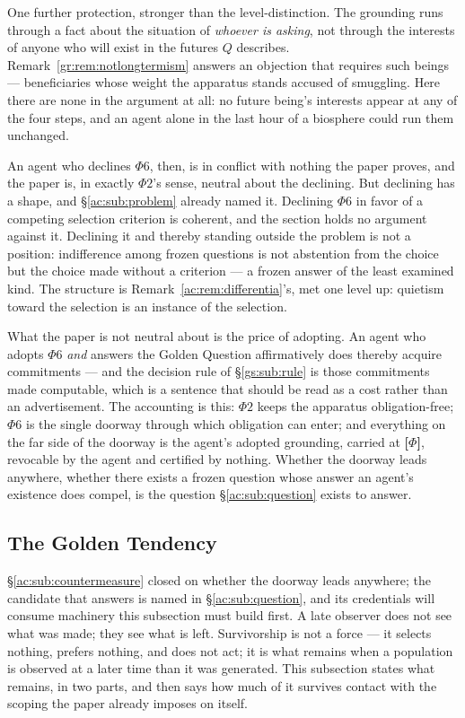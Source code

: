 \documentclass[11pt]{article}
\numberwithin{equation}{section}
\theoremstyle{plain}
\theoremstyle{definition}
\theoremstyle{remark}
\begin{document}
One further protection, stronger than the level-distinction. The grounding runs through a fact about the situation of \emph{whoever is asking}, not through the interests of anyone who will exist in the futures $Q$ describes. Remark~\ref{gr:rem:notlongtermism} answers an objection that requires such beings --- beneficiaries whose weight the apparatus stands accused of smuggling. Here there are none in the argument at all: no future being's interests appear at any of the four steps, and an agent alone in the last hour of a biosphere could run them unchanged.

An agent who declines $\Phi6$, then, is in conflict with nothing the paper proves, and the paper is, in exactly $\Phi2$'s sense, neutral about the declining. But declining has a shape, and \S\ref{ac:sub:problem} already named it. Declining $\Phi6$ in favor of a competing selection criterion is coherent, and the section holds no argument against it. Declining it and thereby standing outside the problem is not a position: indifference among frozen questions is not abstention from the choice but the choice made without a criterion --- a frozen answer of the least examined kind. The structure is Remark~\ref{ac:rem:differentia}'s, met one level up: quietism toward the selection is an instance of the selection.

What the paper is not neutral about is the price of adopting. An agent who adopts $\Phi6$ \emph{and} answers the Golden Question affirmatively does thereby acquire commitments --- and the decision rule of \S\ref{gs:sub:rule} is those commitments made computable, which is a sentence that should be read as a cost rather than an advertisement. The accounting is this: $\Phi2$ keeps the apparatus obligation-free; $\Phi6$ is the single doorway through which obligation can enter; and everything on the far side of the doorway is the agent's adopted grounding, carried at \textbf{[$\Phi$]}, revocable by the agent and certified by nothing. Whether the doorway leads anywhere, whether there exists a frozen question whose answer an agent's existence does compel, is the question \S\ref{ac:sub:question} exists to answer.

\subsection{The Golden Tendency}\label{ac:sub:tendency}

\S\ref{ac:sub:countermeasure} closed on whether the doorway leads anywhere; the candidate that answers is named in \S\ref{ac:sub:question}, and its credentials will consume machinery this subsection must build first. A late observer does not see what was made; they see what is left. Survivorship is not a force --- it selects nothing, prefers nothing, and does not act; it is what remains when a population is observed at a later time than it was generated. This subsection states what remains, in two parts, and then says how much of it survives contact with the scoping the paper already imposes on itself.
\end{document}
